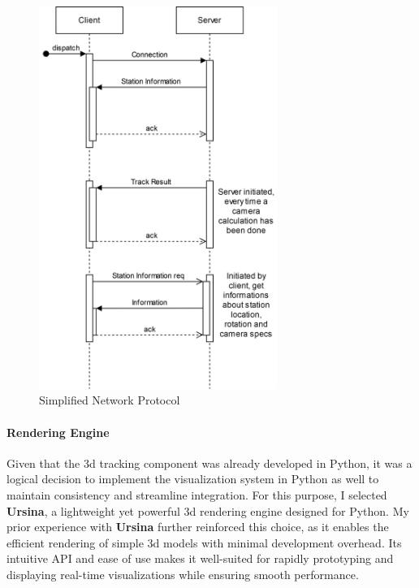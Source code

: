 \begin{figure}[H]
	\centering
	\hspace*{-1.5cm}
	\includegraphics[width=220pt]{figures/SS_Protocol}
	\caption{Simplified Network Protocol}
	\label{fig:ssprotocol}
\end{figure}

\paragraph{Rendering Engine}
Given that the \acrshort{3d} tracking component was already developed in Python, it was a logical decision to implement the visualization system in Python as well to maintain consistency and streamline integration. For this purpose, I selected \textbf{Ursina}, a lightweight yet powerful \acrfull{3d} rendering engine designed for Python. My prior experience with \textbf{Ursina} further reinforced this choice, as it enables the efficient rendering of simple \acrshort{3d} models with minimal development overhead. Its intuitive API and ease of use makes it well-suited for rapidly prototyping and displaying real-time visualizations while ensuring smooth performance.

